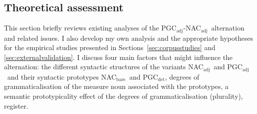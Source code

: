 \documentclass[USenglish]{article}
\newcommand{\Sub}[1]{\ensuremath{\mathrm{_{#1}}}}
\newcommand{\NACb}{NAC\Sub{bare}}
\newcommand{\NACa}{NAC\Sub{adj}}
\newcommand{\PGCd}{PGC\Sub{det}}
\newcommand{\PGCa}{PGC\Sub{adj}}
\begin{document}
\subsection{Theoretical assessment}
\label{sec:analyses}

This section briefly reviews existing analyses of the \PGCa-\NACa\ alternation and related issues.
I also develop my own analysis and the appropriate hypotheses for the empirical studies presented in Sections~\ref{sec:corpusstudies} and \ref{sec:externalvalidation}.
I discuss four main factors that might influence the alternation:
the different syntactic structures of the variants \NACa\ and \PGCa\ and their syntactic prototypes \NACb\ and \PGCd,
degrees of grammaticalisation of the measure noun associated with the prototypes,
a semantic prototypicality effect of the degrees of grammaticalisation (plurality),
register.
\end{document}
